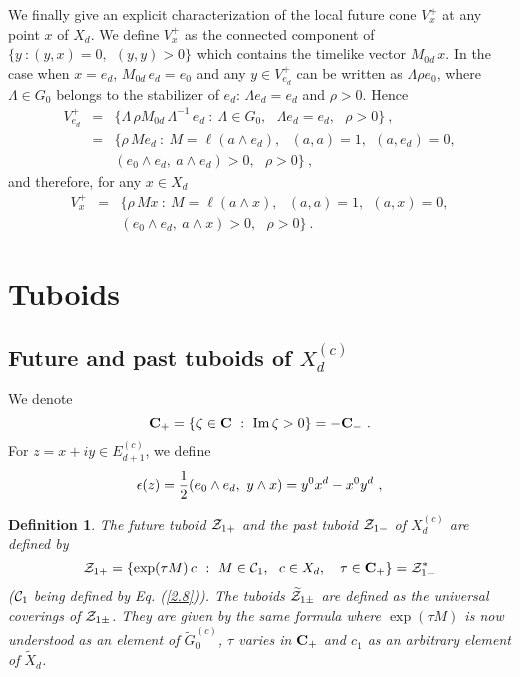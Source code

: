 \documentclass[a4paper,a4paper]{article}
\let\UnmodifSec=\section
\renewcommand{\section}{\setcounter{equation}{0}\UnmodifSec}
\newtheorem{definition}{Definition}[section]
\newcommand{\z}{\underline{z}}
\def\z{{\zeta}}
\def\bC{{\bf C}}
\def\Im{{\rm Im\,}}
\def\CC{{\cal C}}
\def\ZZ{{\cal Z}}
\def\wt{\widetilde}
\def\wXd{{\wt X_d}}
\def\amb{E_{d+1}}
\def\ambc{\amb^{(c)}}
\begin{document}
We finally give an explicit characterization of the local future cone
$V^+_x$ at any point $x$ of $X_d$.
We define
$V^+_x$ as the connected component of $\{y\ : (y,x) =0,\ \
(y,y) >0\}$ which contains the timelike vector $M_{0d}\,x$.
In the case when
$x= e_d$, $M_{0d}\,e_d = e_0$ and any $y \in V^+_{e_d}$ can be
written as $\Lambda \rho e_0$, where $\Lambda \in G_0$ belongs to
the stabilizer of $e_d$: $\Lambda e_d = e_d$ and $\rho >0$. Hence
\begin{eqnarray}
V^+_{e_d} &=& \{\Lambda\,\rho M_{0d}\,\Lambda^{-1}\,e_d\ :\
\Lambda \in G_0,\ \ \ \Lambda e_d = e_d,\ \ \ \rho > 0\}\ ,
\nonumber \\
&=& \{\rho\,Me_d\ :\ M = \ell(a\wedge e_d),\ \ \ (a,a) = 1,\ \
(a,e_d) = 0,\nonumber \\
&& (e_0\wedge e_d,\ a\wedge e_d) >0,\ \ \ \rho>0\}\ ,
\label{2.9}
\end{eqnarray}
and therefore, for any $x \in X_d$
\begin{eqnarray}
V^+_x &=& \{\rho\,Mx\ :\ M = \ell(a\wedge x),\ \ \ (a,a) = 1,\ \
(a,x) = 0,\nonumber \\
&& (e_0\wedge e_d,\ a\wedge x) >0,\ \ \ \rho>0\}\ .
\label{2.10}\end{eqnarray}




\section{Tuboids}

\label{TUB}
\subsection{Future and past tuboids of $X_d^{(c)}$}
\label{TFP}


We denote
\begin{equation}
\bC_+ = \{\z \in \bC\ :\ \Im \z > 0\} = -\bC_-\ .
\label{3.1}\end{equation}
For $z = x+iy \in \ambc$, we define
\begin{equation}
\epsilon(z) = {1\over 2}(e_0\wedge e_d,\ y\wedge x) = y^0 x^d - x^0 y^d\ ,
\label{3.1.0}\end{equation}

\begin{definition}
\label{deftub1}
The future tuboid $\ZZ_{1+}$ and the past tuboid $\ZZ_{1-}$
of $X_d^{(c)}$ are defined
by
\begin{equation}
\ZZ_{1+} = \{\exp(\tau M)\,c\ :\ M \in \CC_1,\ \ c \in X_d,\ \ \
\tau \in \bC_+\} = \ZZ_{1-}^*
\label{3.1.1}\end{equation}
($\CC_1$ being defined by Eq. (\ref{2.8})).
The tuboids $\wt \ZZ_{1\pm}$ are defined as
the universal coverings of $\ZZ_{1\pm}$.
They are given  by the same formula
where
$\exp(\tau M)$ is now understood as an element of $\wt G_0^{(c)}$,
$\tau$ varies in $\bC_+$
and $c_1$ as an arbitrary element of $\wXd$.
\end{definition}
\end{document}
